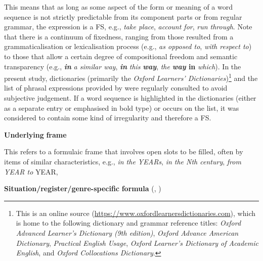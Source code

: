 \documentclass[output=paper]{langsci/langscibook}
\begin{document}
This means that as long as some aspect of the form or meaning of a word sequence is not strictly predictable from its component parts or from regular grammar, the expression is a FS, e.g., \textit{take place}, \textit{account for}, \textit{run through}. Note that there is a continuum of fixedness, ranging from those resulted from a grammaticalisation or lexicalisation process (e.g., \textit{as opposed to}, \textit{with respect to}) to those that allow a certain degree of compositional freedom and semantic transparency (e.g., \textbf{\textit{in}} \textit{a similar way}, \textbf{\textit{in}} \textit{this} \textbf{\textit{way}}, \textit{the} \textbf{\textit{way} \textbf{in}} \textit{which}). In the present study, dictionaries (primarily the \textit{Oxford Learners’ Dictionaries})\footnote{ \textrm{This is an online source (}\url{https://www.oxfordlearnersdictionaries.com}\textrm{), which is home to the following dictionary and grammar reference titles:} \textrm{\textit{Oxford Advanced Learner’s Dictionary (9th edition)}}, \textrm{\textit{Oxford Advance American Dictionary}}, \textrm{\textit{Practical English Usage}}, \textrm{\textit{Oxford Learner’s Dictionary of Academic English}}\textrm{, and} \textrm{\textit{Oxford Collocations Dictionary}}.} and the list of phrasal expressions provided by \citet{MartinezSchmitt2012} were regularly consulted to avoid subjective judgement. If a word sequence is highlighted in the dictionaries (either as a separate entry or emphasised in bold type) or occurs on the list, it was considered to contain some kind of irregularity and therefore a FS.

\textbf{Underlying} \textbf{frame} \citep{Wray2008}

This refers to a formulaic frame that involves open slots to be filled, often by items of similar characteristics, e.g., \textit{in the YEARs}, \textit{in the Nth century}, \textit{from YEAR to} YEAR, 

\textbf{Situation/register/genre-specific} \textbf{formula} (\citealt{Wray2008}, \citealt{Buerki2016})
\end{document}
